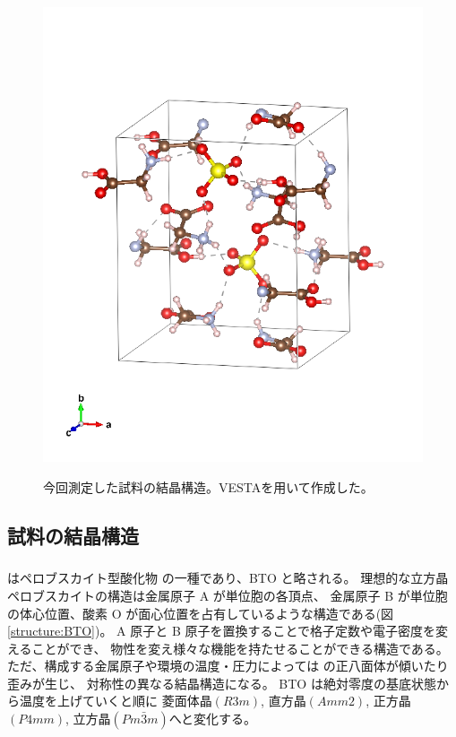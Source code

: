 \documentclass[11pt,dvipdfmx,a4paper]{jsarticle}
\begin{document}
\begin{figure}[H]
\begin{minipage}[t]{0.48\columnwidth}
        \includegraphics[width = \columnwidth]{TGS.png}
        \label{structure:TGS}
    \end{minipage}
    \caption{今回測定した試料の結晶構造。VESTA\cite{VESTA}を用いて作成した。}
\end{figure}

\subsection{試料の結晶構造}
\subsubsection*{}
 はペロブスカイト型酸化物  の一種であり、BTO と略される。
理想的な立方晶ペロブスカイトの構造は金属原子 A が単位胞の各頂点、
金属原子 B が単位胞の体心位置、酸素 O が面心位置を占有しているような構造である(図\ref{structure:BTO})。
A 原子と B 原子を置換することで格子定数や電子密度を変えることができ、
物性を変え様々な機能を持たせることができる構造である。
ただ、構成する金属原子や環境の温度・圧力によっては  の正八面体が傾いたり歪みが生じ、
対称性の異なる結晶構造になる。
BTO は絶対零度の基底状態から温度を上げていくと順に
菱面体晶$(R3m)$, 直方晶$(Amm2)$,
正方晶$(P4mm)$,
立方晶$(Pm\bar{3}m)$へと変化する。
\end{document}
